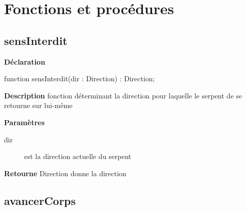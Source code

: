 \documentclass{report}
\newif\ifpdf
\begin{document}
\section{Fonctions et procédures}
\ifpdf
\subsection*{\large{\textbf{sensInterdit}}\normalsize\hspace{1ex}\hrulefill}
\else
\subsection*{sensInterdit}
\fi
\label{Deplacement-sensInterdit}
\begin{list}{}{
\setlength{\itemindent}{0cm}
\setlength{\listparindent}{0cm}
\setlength{\leftmargin}{\evensidemargin}
\addtolength{\leftmargin}{\tmplength}
\settowidth{\labelsep}{X}
\addtolength{\leftmargin}{\labelsep}
\setlength{\labelwidth}{\tmplength}
}
\item[\textbf{Déclaration}\hfill]
\ifpdf
\begin{flushleft}
\fi
\begin{ttfamily}
function sensInterdit(dir : Direction) : Direction;\end{ttfamily}

\ifpdf
\end{flushleft}
\fi

\par
\item[\textbf{Description}]
fonction déterminant la direction pour laquelle le serpent de se retourne sur lui{-}même  \par
\item[\textbf{Paramètres}]
\begin{description}
\item[dir] est la direction actuelle du serpent
\end{description}
\item[\textbf{Retourne}]Direction donne la direction 


\end{list}
\ifpdf
\subsection*{\large{\textbf{avancerCorps}}\normalsize\hspace{1ex}\hrulefill}
\else
\end{document}
